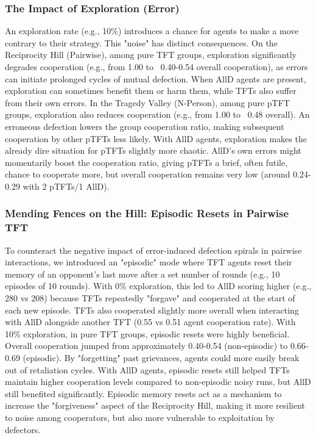 \documentclass[]{llncs} %
\begin{document}
\subsubsection{The Impact of Exploration (Error)}
An exploration rate (e.g., 10\%) introduces a chance for agents to make a move contrary to their strategy. This "noise" has distinct consequences.
On the Reciprocity Hill (Pairwise), among pure TFT groups, exploration significantly degrades cooperation (e.g., from 1.00 to ~0.40-0.54 overall cooperation), as errors can initiate prolonged cycles of mutual defection. When AllD agents are present, exploration can sometimes benefit them or harm them, while TFTs also suffer from their own errors.
In the Tragedy Valley (N-Person), among pure pTFT groups, exploration also reduces cooperation (e.g., from 1.00 to ~0.48 overall). An erroneous defection lowers the group cooperation ratio, making subsequent cooperation by other pTFTs less likely. With AllD agents, exploration makes the already dire situation for pTFTs slightly more chaotic. AllD's own errors might momentarily boost the cooperation ratio, giving pTFTs a brief, often futile, chance to cooperate more, but overall cooperation remains very low (around 0.24-0.29 with 2 pTFTs/1 AllD).

\subsubsection{Mending Fences on the Hill: Episodic Resets in Pairwise TFT}
To counteract the negative impact of error-induced defection spirals in pairwise interactions, we introduced an "episodic" mode where TFT agents reset their memory of an opponent's last move after a set number of rounds (e.g., 10 episodes of 10 rounds).
With 0\% exploration, this led to AllD scoring higher (e.g., 280 vs 208) because TFTs repeatedly "forgave" and cooperated at the start of each new episode. TFTs also cooperated slightly more overall when interacting with AllD alongside another TFT (0.55 vs 0.51 agent cooperation rate).
With 10\% exploration, in pure TFT groups, episodic resets were highly beneficial. Overall cooperation jumped from approximately 0.40-0.54 (non-episodic) to 0.66-0.69 (episodic). By "forgetting" past grievances, agents could more easily break out of retaliation cycles. With AllD agents, episodic resets still helped TFTs maintain higher cooperation levels compared to non-episodic noisy runs, but AllD still benefited significantly. Episodic memory resets act as a mechanism to increase the "forgiveness" aspect of the Reciprocity Hill, making it more resilient to noise among cooperators, but also more vulnerable to exploitation by defectors.
\end{document}
